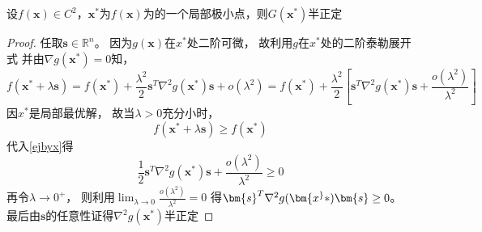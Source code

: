     \begin{theorem}[二阶必要条件]
        设$f(\bm{x})\in C^2$，$\bm{x}^*$为$f(\bm{x})$为的一个局部极小点，则$G(\bm{x}^*)$半正定
    \end{theorem}
    \begin{proof}
        任取$\bm{s}\in \mathbb{R}^n$。
        因为$g(\bm{x})$在$x^*$处二阶可微，
        故利用$g$在$x^*$处的二阶泰勒展开式
        并由$\nabla g(\bm{x}^*)=0$知，
        \begin{equation}\label{ejbyx}
            f(\bm{x}^*+\lambda\bm{s}) = 
            f(\bm{x}^*) + \displaystyle\frac{\lambda^2}{2}\bm{s}^T\nabla^2g(\bm{x}^*)\bm{s} + o(\lambda^2) = 
            f(\bm{x}^*) + \displaystyle\frac{\lambda^2}{2}\left[\bm{s}^T\nabla^2g(\bm{x}^*)\bm{s} + \displaystyle\frac{o(\lambda^2)}{\lambda^2}\right]
        \end{equation}
        因$x^*$是局部最优解，
        故当$\lambda>0$充分小时，
        \begin{equation*}
            f(\bm{x}^*+\lambda\bm{s}) \geq 
            f(\bm{x}^*)
        \end{equation*}
        代入\eqref{ejbyx}得
        \begin{equation*}
            \displaystyle\frac{1}{2}\bm{s}^T\nabla^2g(\bm{x}^*)\bm{s} + \displaystyle\frac{o(\lambda^2)}{\lambda^2} \geq 0
        \end{equation*}
        再令$\lambda\to0^+$，
        则利用$\displaystyle\lim_{\lambda\to0}\frac{o(\lambda^2)}{\lambda^2} = 0$
        得$\bm{s}^T\nabla^2g(\bm{x^}*)\bm{s} \geq 0$。
        最后由$\bm{s}$的任意性证得$\nabla^2g(\bm{x}^*)$半正定
    \end{proof}

